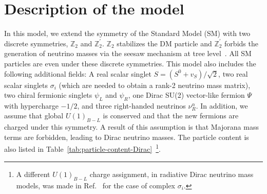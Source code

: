 \documentclass[12pt,letterpaper]{article}
\begin{document}
\section{Description of the model}
\label{sec:model}
In this model, we extend the symmetry of the Standard Model (SM) with two discrete symmetries, $\mathbb{Z}_2$ and $\mathbb{Z}_2^{'}$. $\mathbb{Z}_2$ stabilizes the DM particle and $\mathbb{Z}_2^{'}$ forbids the generation of neutrino masses via the seesaw mechanism at tree level~\cite{Chulia:2016ngi,CentellesChulia:2018gwr}. All SM particles are even under these discrete symmetries. This model also includes the following additional fields: A real scalar singlet $S=(S^0+v_S)/\sqrt{2}$, two real scalar singlets $\sigma_i$ (which are needed to obtain a rank-2 neutrino mass matrix), two chiral fermionic singlets $\psi_{L}$ and $\psi_{R}$, one Dirac SU(2) vector-like fermion $\Psi$ with hypercharge $-1/2$, and three right-handed neutrinos $\nu_R^\alpha$. In addition, we assume that global $U(1)_{B-L}$ is conserved and that the new fermions are charged under this symmetry. A result of this assumption is that Majorana mass terms are forbidden, leading to Dirac neutrino masses. The particle content is also listed in Table~\ref{tab:particle-content-Dirac}~\footnote{A different $U(1)_{B-L}$ charge assignment, in radiative Dirac neutrino mass models, was made in Ref.~\cite{Calle:2018ovc} for the case of complex $\sigma_i$.}.
\end{document}
